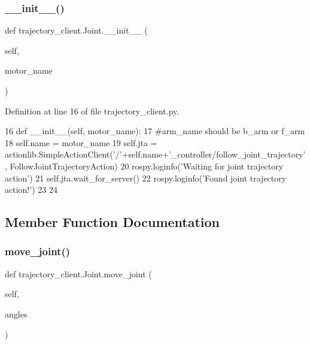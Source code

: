 \subsubsection{\texorpdfstring{\+\_\+\+\_\+init\+\_\+\+\_\+()}{\_\_init\_\_()}}
{\footnotesize\ttfamily def trajectory\+\_\+client.\+Joint.\+\_\+\+\_\+init\+\_\+\+\_\+ (\begin{DoxyParamCaption}\item[{}]{self,  }\item[{}]{motor\+\_\+name }\end{DoxyParamCaption})}



Definition at line 16 of file trajectory\+\_\+client.\+py.


\begin{DoxyCode}
16         \textcolor{keyword}{def }\_\_init\_\_(self, motor\_name):
17             \textcolor{comment}{#arm\_name should be b\_arm or f\_arm}
18             self.name = motor\_name
19             self.jta = actionlib.SimpleActionClient(\textcolor{stringliteral}{'/'}+self.name+\textcolor{stringliteral}{'\_controller/follow\_joint\_trajectory'}, 
      FollowJointTrajectoryAction)
20             rospy.loginfo(\textcolor{stringliteral}{'Waiting for joint trajectory action'})
21             self.jta.wait\_for\_server()
22             rospy.loginfo(\textcolor{stringliteral}{'Found joint trajectory action!'})
23 
24 
\end{DoxyCode}


\subsection{Member Function Documentation}
\mbox{\label{classtrajectory__client_1_1_joint_a0d8109140ca6092a4fa5e92fe75aaeb9}} 
\subsubsection{\texorpdfstring{move\+\_\+joint()}{move\_joint()}}
{\footnotesize\ttfamily def trajectory\+\_\+client.\+Joint.\+move\+\_\+joint (\begin{DoxyParamCaption}\item[{}]{self,  }\item[{}]{angles }\end{DoxyParamCaption})}




